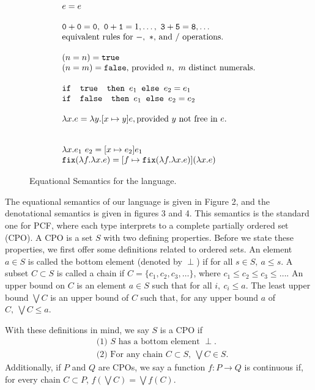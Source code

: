 \begin{figure}
\[
\begin{array}{lr}
e = e \\ \\
\texttt{0} + \texttt{0} = \texttt{0}, \ \texttt{0} + \texttt{1} = 1, \ldots, \ \texttt{3} + \texttt{5} = \texttt{8}, \ldots  \\
\text{equivalent rules for } -, \ * \text{, and } /\text{ operations.}
\\ \\
(n =n) = \texttt{true} \\ (n=m) = \texttt{false}\text{, provided } n, \ m \text{ distinct numerals.}\\ \\ 
\ifelse{\texttt{ true }}{e_1}{e_2} = e_1 \\
\ifelse{\texttt{ false }}{e_1}{e_2} = e_2 \\ \\ 
\lambda x.e = \lambda y.[x \mapsto y]e, \text{provided } y \text{ not free in } e. \\ \\ \\
\lambda x.e_1 \ e_2 = [x \mapsto e_2]e_1 \\
\texttt{fix}(\lambda f. \lambda x.e) = [f \mapsto \texttt{fix}(\lambda f.\lambda x.e)](\lambda x.e)
\end{array}
\]
\caption{Equational Semantics for the language.}
\label{fig:typing}
\end{figure}

The equational semantics of our language is given in Figure 2, and the denotational semantics is given in figures 3 and 4.
This semantics is the standard one for PCF, where each type interprets to a complete
partially ordered set (CPO). A CPO is a set $S$ with two defining properties. Before we state these properties,
we first offer some definitions related to ordered sets. An element $a \in S$ is called the bottom element (denoted by $\perp$) if for all $s \in S, \ a \leq s$. A subset $C \subset S$ is called a chain if $C = \{c_1, c_2, c_3, \dots\}$, where 
$c_1 \leq c_2 \leq c_3 \leq \dots$. An upper bound on $C$ is an element $a \in S$ such that for all $i, \ c_i \leq a$. 
The least upper bound $\bigvee C$ is an upper bound of $C$ such that, for any upper bound $a$ of $C, \ \bigvee C \leq a$.

With these definitions in mind, we say $S$ is a CPO if
\begin{align*}
&\text{(1) $S$ has a bottom element }\perp.\\
&\text{(2) For any chain }C \subset S, \ \bigvee C \in S. 
\end{align*}
Additionally, if $P$ and $Q$ are CPOs, we say a function $f: P \rightarrow Q$ is continuous if, for every chain $C \subset P$, 
$f(\bigvee C) = \bigvee f(C)$.

